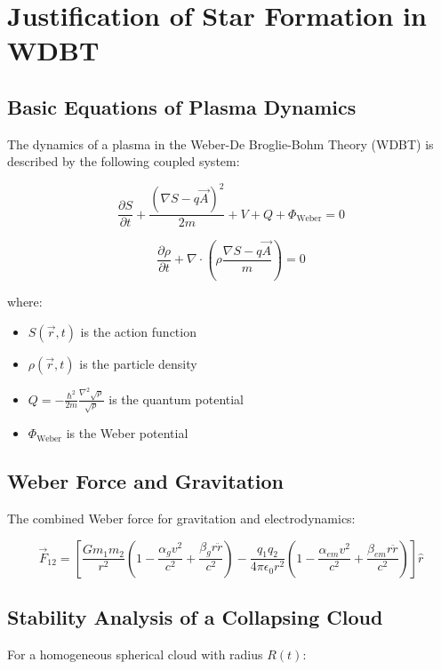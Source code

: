\chapter{Justification of Star Formation in WDBT}
\label{app:sternentstehung}

\section{Basic Equations of Plasma Dynamics}
The dynamics of a plasma in the Weber-De Broglie-Bohm Theory (WDBT) is described by the following coupled system:

\begin{equation}
\frac{\partial S}{\partial t} + \frac{(\nabla S - q\vec{A})^2}{2m} + V + Q + \Phi_{\text{Weber}} = 0
\end{equation}

\begin{equation}
\frac{\partial \rho}{\partial t} + \nabla \cdot \left(\rho \frac{\nabla S - q\vec{A}}{m}\right) = 0
\end{equation}

where:
\begin{itemize}
\item $S(\vec{r},t)$ is the action function
\item $\rho(\vec{r},t)$ is the particle density
\item $Q = -\frac{\hbar^2}{2m}\frac{\nabla^2 \sqrt{\rho}}{\sqrt{\rho}}$ is the quantum potential
\item $\Phi_{\text{Weber}}$ is the Weber potential
\end{itemize}

\section{Weber Force and Gravitation}
The combined Weber force for gravitation and electrodynamics:

\begin{equation}
    \label{eq:weber_em_und_g}
    \vec{F}_{12} = \left[ \frac{G m_1 m_2}{r^2} \left( 1 - \frac{\alpha_g v^2}{c^2} + \frac{\beta_g r \ddot{r}}{c^2} \right) - \frac{q_1 q_2}{4\pi\epsilon_0 r^2} \left( 1 - \frac{\alpha_{em} v^2}{c^2} + \frac{\beta_{em} r \ddot{r}}{c^2} \right) \right] \hat{r}
\end{equation}

\section{Stability Analysis of a Collapsing Cloud}
For a homogeneous spherical cloud with radius $R(t)$:

